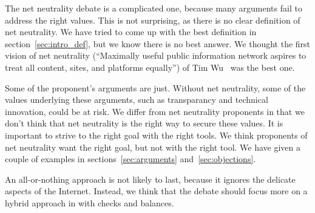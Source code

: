 The net neutrality debate is a complicated one, because many arguments fail to address the right values. This is not surprising, as there is no clear definition of net neutrality. We have tried to come up with the best definition in section~\ref{sec:intro_def}, but we know there is no best answer. We thought the first vision of net neutrality (``Maximally useful public information network aspires to treat all content, sites, and platforms equally'') of Tim Wu~\cite{wu2003network} was the best one.

Some of the proponent's arguments are just. Without net neutrality, some of the values underlying these arguments, such as transparancy and technical innovation, could be at risk. We differ from net neutrality proponents in that we don't think that net neutrality is the right way to secure these values. It is important to strive to the right goal with the right tools. We think proponents of net neutrality want the right goal, but not with the right tool. We have given a couple of examples in sections~\ref{sec:arguments} and~\ref{sec:objections}.

An all-or-nothing approach is not likely to last, because it ignores the delicate aspects of the Internet. Instead, we think that the debate should focus more on a hybrid approach in with checks and balances.